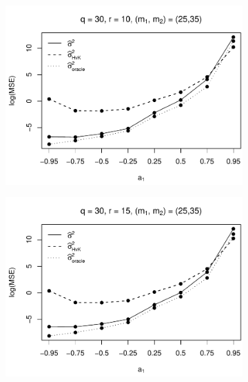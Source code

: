 \begin{figure}[p]
\begin{subfigure}[b]{0.45\textwidth}
\includegraphics[width=\textwidth]{Plots/Robustness/MSE_lrv_T=500_slope=10_(q,K1,K2,M1,M2)=(30,2,10,25,35).pdf}
\end{subfigure}
\hspace{0.25cm}
\begin{subfigure}[b]{0.45\textwidth}
\includegraphics[width=\textwidth]{Plots/Robustness/MSE_lrv_T=500_slope=10_(q,K1,K2,M1,M2)=(30,2,15,25,35).pdf}
\end{subfigure}


\end{figure}
